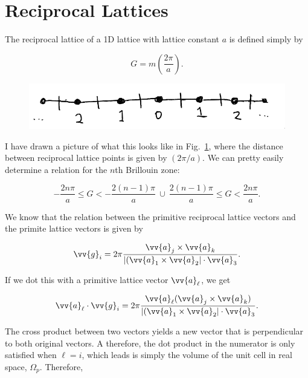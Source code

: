 \section{Reciprocal Lattices}

\begin{parts}
\item The reciprocal lattice of a 1D lattice with lattice constant $a$ is defined simply by

  \begin{equation}
    G = m\left(\frac{2\pi}{a} \right).
  \end{equation}

  \begin{figure}
    \centering
    \includegraphics[width=0.6\linewidth]{./res/Pics/4-a.png}
    \caption{}\label{fig:4-a}
  \end{figure}

  I have drawn a picture of what this looks like in Fig.~\ref{fig:4-a}, where the distance between reciprocal lattice points is given by $(2\pi/a)$. We can pretty easily determine a relation for the $n$th Brillouin zone:

  \begin{equation}
    - \frac{2n\pi}{a} \leq G < - \frac{2(n-1)\pi}{a} \ \cup \ \frac{2(n-1)\pi}{a} \leq G < \frac{2n\pi}{a}.
  \end{equation}



\item We know that the relation between the primitive reciprocal lattice vectors and the primite lattice vectors is given by

  \begin{equation}
    \vv{g}_i = 2\pi \frac{\vv{a}_j \times \vv{a}_k}{|(\vv{a}_1 \times \vv{a}_2| \cdot \vv{a}_3}.
  \end{equation}

  If we dot this with a primitive lattice vector $\vv{a}_\ell$, we get

  \begin{equation}
    \vv{a}_\ell \cdot \vv{g}_i = 2\pi \frac{\vv{a}_\ell (\vv{a}_j \times \vv{a}_k)}{|(\vv{a}_1 \times \vv{a}_2| \cdot \vv{a}_3}.
  \end{equation}

  The cross product between two vectors yields a new vector that is perpendicular to both original vectors. A therefore, the dot product in the numerator is only satisfied when $\ell=i$, which leads is simply the volume of the unit cell in real space, $\Omega_p$. Therefore,


\end{parts}
